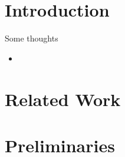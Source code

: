 \documentclass[acmsmall,screen,review,anonymous,nonacm]{PLDI/acmart}
\begin{document}

\section{Introduction}

Some thoughts 
\begin{itemize}
    \item 
\end{itemize}


\section{Related Work}

\section{Preliminaries}
\end{document}
